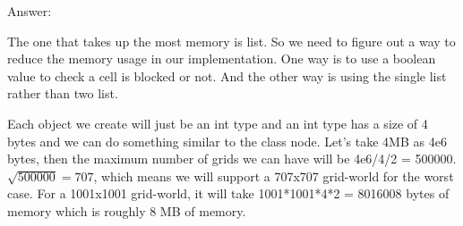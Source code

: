 \documentclass{article}
\begin{document}

Answer: \newline
\par The one that takes up the most memory is list. So we need to figure out a way to reduce the memory usage in our implementation. One way is to use a boolean value to check
a cell is blocked or not. And the other way is using the single list rather than two list.

\par Each object we create will just be an int type and an int type has a size of 4 bytes and we can do something similar to the class node. Let's take 4MB as 4e6 bytes, then the maximum number of grids we can have will be 4e6/4/2 = 500000. $\sqrt{500000}=707$, which means we will support a 707x707 grid-world for the worst case. For a 1001x1001 grid-world, it will take 1001*1001*4*2 = 8016008 bytes of memory which is roughly 8 MB of memory.
\end{document}
